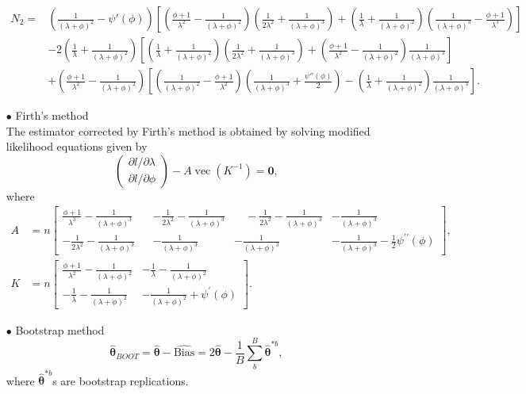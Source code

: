 \begin{itemize}
	$\begin{aligned}
	N_{2} =&  \left( \frac{1}{(\lambda + \phi)^2} - \psi' (\phi) \right) \left[ \left(   \frac{\phi+1}{\lambda^2} - \frac{1}{(\lambda + \phi)^2} \right) \left( \frac{1}{2 \lambda^2} + \frac{1}{(\lambda + \phi)^3}  \right) + \left( \frac{1}{\lambda} + \frac{1}{(\lambda + \phi)^2} \right)  \left( \frac{1}{(\lambda + \phi)^3} - \frac{\phi+1}{\lambda^3}  \right) \right] \\
	&- 2 \left( \frac{1}{\lambda} + \frac{1}{(\lambda + \phi)^2}  \right) \left[ \left( \frac{1}{\lambda} + \frac{1}{(\lambda + \phi)^2} \right) \left( \frac{1}{2 \lambda^2} + \frac{1}{( \lambda + \phi)^3} \right) + \left( \frac{\phi+1}{\lambda^2} - \frac{1}{(\lambda + \phi)^2} \right) \frac{1}{(\lambda + \phi)^3}  \right]\\
	&+ \left( \frac{\phi+1}{\lambda^2} - \frac{1}{(\lambda+ \phi)^2}  \right) \left[ \left( \frac{1}{(\lambda +\phi)^2} - \frac{\phi+1}{\lambda^2} \right)  \left( \frac{1}{(\lambda + \phi)^3} + \frac{\psi'' (\phi)}{2} \right)  - \left( \frac{1}{\lambda} + \frac{1}{(\lambda+\phi)^2} \right) \frac{1}{(\lambda + \phi)^3} \right].
	\end{aligned}$\\
	
	\item[$\bullet$] Firth's method \\
	The estimator corrected by Firth's method is obtained by solving modified likelihood equations given by
	$$ \left(\begin{array}{l}
	\partial l / \partial \lambda \\
	\partial l / \partial \phi
	\end{array}\right)-A \operatorname{vec}\left(K^{-1}\right)=\boldsymbol{0}, $$
	where\\
	$\begin{aligned}
	A &= n\left[\begin{array}{cccc}
	\frac{\phi+1}{\lambda^{3}}-\frac{1}{(\lambda+\phi)^{3}}\quad&-\frac{1}{2 \lambda^{2}}-\frac{1}{(\lambda+\phi)^{3}} & \quad-\frac{1}{2 \lambda^{2}}-\frac{1}{(\lambda+\phi)^{3}} & -\frac{1}{(\lambda+\phi)^{3}}\quad\quad\\
	-\frac{1}{2 \lambda^{2}}-\frac{1}{(\lambda+\phi)^{3}} & -\frac{1}{(\lambda+\phi)^{3}} & -\frac{1}{(\lambda+\phi)^{3}} & -\frac{1}{(\lambda+\phi)^{3}}-\frac{1}{2} \psi^{\prime \prime}(\phi)
	\end{array}\right],\\
	K &= n\left[\begin{array}{cc}
	\frac{\phi+1}{\lambda^{2}}-\frac{1}{(\lambda+\phi)^{2}} & -\frac{1}{\lambda}-\frac{1}{(\lambda+\phi)^{2}} \\
	-\frac{1}{\lambda}-\frac{1}{(\lambda+\phi)^{2}} & -\frac{1}{(\lambda+\phi)^{2}}+\psi^{\prime}(\phi)
	\end{array}\right]. \end{aligned}$
	\item[$\bullet$] Bootstrap method
	$$\widehat{\boldsymbol{\theta}}_{B O O T}=\widehat{\boldsymbol{\theta}}-\widehat{\text {Bias}}=2 \widehat{\boldsymbol{\theta}}-\frac{1}{B} \sum_{b}^{B} \widehat{\boldsymbol{\theta}}^{* b},$$
	where $\widehat{\boldsymbol{\theta}}^{* b}$s are bootstrap replications.
\end{itemize}
